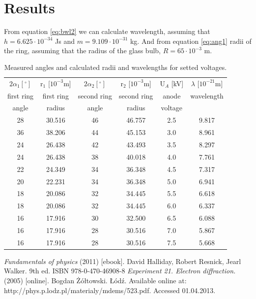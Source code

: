 \documentclass[a4paper,12pt]{article}
\begin{document}
\section{Results}
From equation \ref{eq:bwl2} we can calculate wavelength, assuming that $h = 6.625 \cdot 10^{-34}$ Js and $m = 9.109 \cdot 10 ^ {-31}$ kg. And from equation \ref{eq:ang1} radii of the ring, assuming that the radius of the glass bulb, $R = 65 \cdot 10^{-3}$ m.
\begin{table}[h]
    \begin{center}
        \caption{Measured angles and calculated radii and wavelengths for setted voltages.}
        \label{tab:resoults}
        \begin{tabular}{|c|c|c|c|c|c|}
            \hline
            $2\alpha_1 [^\circ]$ & r$_1$ [$10^{-3}$m] & $2\alpha_2 [^\circ]$ & r$_2$ [$10^{-3}$m] & U$_A$ [kV] & $\lambda$ [$10^{-21}$m] \\
            first ring & first ring & second ring & second ring & anode & wavelength \\ 
            angle & radius & angle & radius & voltage & \\
            \hline 
            28 & 30.516 & 46 & 46.757 & 2.5 & 9.817 \\
            \hline
            36 & 38.206 & 44 & 45.153 & 3.0 & 8.961 \\
            \hline
            24 & 26.438 & 42 & 43.493 & 3.5 & 8.297 \\
            \hline
            24 & 26.438 & 38 & 40.018 & 4.0 & 7.761 \\
            \hline
            22 & 24.349 & 34 & 36.348 & 4.5 & 7.317 \\
            \hline
            20 & 22.231 & 34 & 36.348 & 5.0 & 6.941 \\
            \hline
            18 & 20.086 & 32 & 34.445 & 5.5 & 6.618 \\
            \hline
            18 & 20.086 & 32 & 34.445 & 6.0 & 6.337 \\
            \hline
            16 & 17.916 & 30 & 32.500 & 6.5 & 6.088 \\
            \hline
            16 & 17.916 & 28 & 30.516 & 7.0 & 5.867 \\
            \hline
            16 & 17.916 & 28 & 30.516 & 7.5 & 5.668 \\
            \hline
        \end{tabular}
    \end{center}
\end{table}



\begin{thebibliography}{9}
    \emph{Fundamentals of physics} (2011) [ebook]. David Halliday, Robert Resnick, Jearl Walker. 9th ed. ISBN 978-0-470-46908-8
    \emph{Experiment 21. Electron diffraction.} (2005) [online]. Bogdan Żółtowski. Łódź. Available online at: http://phys.p.lodz.pl/materialy/mdems/523.pdf. Accessed 01.04.2013.  
\end{thebibliography}
\end{document}
